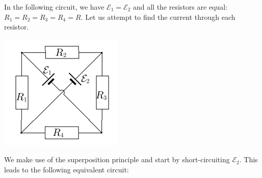 \documentclass{article}
\begin{document}
    \begin{example}
        In the following circuit, we have $\mathcal{E}_1=\mathcal{E}_2$ and all the resistors are equal: $R_1=R_2=R_3=R_4=R$. Let us attempt to find the current through each resistor.
        \begin{center}
            \includegraphics[width=0.3\linewidth]{estpho2012.png}
        \end{center}
        We make use of the superposition principle and start by short-circuiting $\mathcal{E}_2$. This leads to the following equivalent circuit:
    \begin{center}
\end{center}
\end{example}
\end{document}
